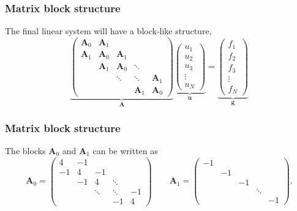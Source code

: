 \begin{frame}
  \frametitle{Matrix block structure}
  The final linear system will have a block-like structure,
  \[
    \underbrace{
      \begin{pmatrix}
        \bm A_0 & \bm A_1 & & & \\
        \bm A_1 & \bm A_0 & \bm A_1 & & \\
        & \bm A_1 & \bm A_0 & \ddots & \\
        & & \ddots & \ddots & \bm A_1 \\
        & & & \bm A_1 & \bm A_0
      \end{pmatrix}}_{\bm A}
    \underbrace{
      \begin{pmatrix}
        u_1 \\ u_2 \\ u_3 \\ \vdots \\ u_N
      \end{pmatrix}}_{\bm u}
    =
    \underbrace{
      \begin{pmatrix}
        f_1 \\ f_2 \\ f_3 \\ \vdots \\ f_N
      \end{pmatrix}}_{\bm g}
  \]
\end{frame}

\begin{frame}
  \frametitle{Matrix block structure}
  The blocks $\bm A_0$ and $\bm A_1$ can be written as
  \[
    \bm A_0 =
    \begin{pmatrix}
      4 & -1 & & & \\
      -1 & 4 & -1 & & \\
      & -1 & 4 & \ddots & \\
      & & \ddots & \ddots & -1 \\
      & & & -1 & 4
    \end{pmatrix}
    \qquad
    \bm A_1 =
    \begin{pmatrix}
      -1 & & & & \\
      & -1 & & & \\
      & & -1 & & \\
      & & & \ddots & \\
      & & & & -1
    \end{pmatrix}.
  \]
\end{frame}


